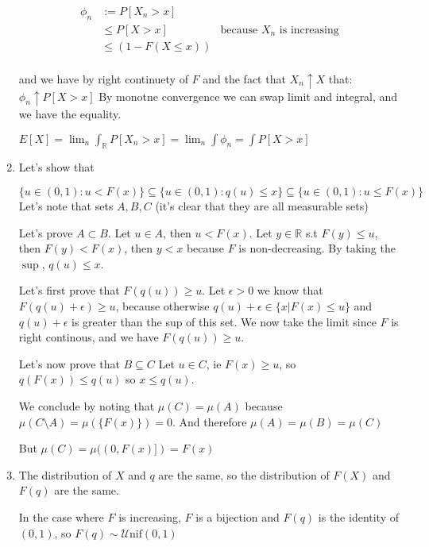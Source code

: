 \documentclass[12pt]{article}
\begin{document}
\begin{enumerate}
\begin{align*}\phi_n &:= P[X_n > x] \\
&\leq P[X > x] &\text{because $X_n$ is increasing}\\
&\leq (1 - F(X \leq x))\\
\end{align*}

and we have by right continuety of $F$ and the fact that $X_n \uparrow X$ that:
$\phi_n \uparrow P[X > x]$
By monotne convergence we can swap limit and integral, and we have the equality.

$E[X] = \lim_n \int_{\mathbb{R}} P[X_n > x] = \lim_n \int \phi_n = \int P[X > x]$

\item
Let's show that 

$$\{ u \in (0, 1): u < F(x) \} \subseteq\{ u \in (0, 1): q(u) \leq x \} \subseteq \{ u \in (0, 1): u \leq F(x) \} $$
Let's note that sets $A, B, C$ (it's clear that they are all measurable sets)

Let's prove $A \subset B$.
Let $u \in A$, then $u < F(x)$. Let $y \in \mathbb{R}$ s.t $F(y) \leq u$, then $F(y) < F(x)$, then $y < x$ because $F$ is non-decreasing. By taking the $\sup$, $q(u) \leq x$.


Let's first prove that $F(q(u)) \geq u$. 
Let $\epsilon > 0$ we know that $F(q(u)+\epsilon) \geq u$,  because otherwise $q(u) + \epsilon \in \{x | F(x) \leq u\}$ and $q(u) + \epsilon $ is greater than the sup of this set.
We now take the limit since $F$ is right continous, and we have $F(q(u)) \geq u$. 


Let's now prove that $B \subseteq C$ 
Let $u \in C$, ie $F(x) \geq u$, so $q(F(x)) \leq q(u)$ so $x \leq q(u)$.

We conclude by noting that $\mu(C) = \mu(A)$ because $\mu(C \setminus A) = \mu(\{F(x)\}) = 0$.
And therefore $\mu(A) = \mu(B) = \mu(C)$

But $\mu(C) = \mu((0, F(x)]) = F(x)$


\item 
The distribution of $X$ and $q$ are the same, so the distribution of  $F(X)$ and $F(q)$ are the same.

In the case where $F$ is increasing, $F$ is a bijection and $F(q)$ is the identity of $(0, 1)$, so $F(q) \sim \mathcal{U}\text{nif}(0, 1)$

\end{enumerate}
\end{document}

